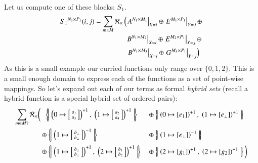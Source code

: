 Let us compute one of these blocks: $S_1$.
\begin{align*}
	{S_1}^{N_1 \times P_1}(i,j) = \sum_{m \in M} \R[\times]  &\left( 
			\left. A^{N_1 \times M_1}\right|_{X=i} \oplus
			\left. E^{M_1 \times P_1}\right|_{Y=j} \oplus \right.\\
			&\;\left. B^{N_1 \times M_2}\right|_{X=i} \oplus
			\left. E^{M_2 \times P_1}\right|_{Y=j} \oplus\\ 
			&\;\left. \left. B^{N_1 \times M_3}\right|_{X=i} \oplus
			\left. G^{M_3 \times P_1}\right|_{Y=j}
	\right)
\end{align*}
As this is a small example our curried functions only range over $\{ 0, 1, 2 \}$.
This is a small enough domain to express each of the functions as a set of point-wise mappings.
So let's expand out each of our terms as formal \emph{hybrid sets} 
(recall a hybrid function is a special hybrid set of ordered pairs):
\begin{align*}
	\sum_{m \in M ?} \R[\times] \bigg( 
		&\;\;\hset{
			\left( 0 \mapsto 
				\left[\begin{smallmatrix}\vphantom{b}a_1 \\ \vphantom{b}a_3 \end{smallmatrix}\right]
			\right)^{+1}, \;
			\left( 1 \mapsto 
				\left[\begin{smallmatrix}\vphantom{b}a_2 \\ \vphantom{b}a_4 \end{smallmatrix}\right]
			\right)^{+1}}  
		&&\oplus \hset{ 
			\left( 0 \mapsto [ e_1 ] \right)^{+1}, \;
			\left( 1 \mapsto [e_\bot] \right)^{+1}} \\ 
		&\oplus \hset{ 
			\left( 1 \mapsto \left[\begin{smallmatrix} b_\bot \\ b_\bot \end{smallmatrix}\right] \right)^{-1} }
		&&\oplus \hset{ 
			\left( 1 \mapsto [ e_\bot ] \right)^{-1} } \\
		&\oplus \hset{
			\left( 1 \mapsto \left[ \begin{smallmatrix} b_\bot \\ b_\bot \end{smallmatrix} \right] \right)^{+1}, \;
			\left( 2 \mapsto \left[ \begin{smallmatrix} b_1 \\ b_2 \end{smallmatrix}\right] \right)^{+1} }
		&&\oplus \hset{
			\left( 2 \mapsto [ g_1 ] \right)^{+1},\; 
			\left( 2 \mapsto [ g_2 ] \right)^{+1}}	\bigg)
\end{align*}


